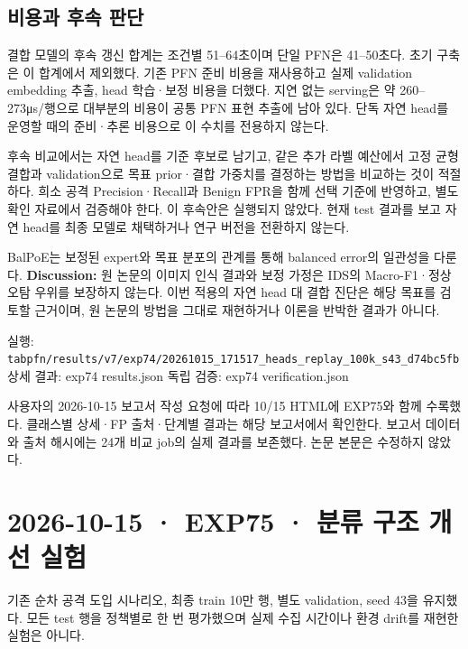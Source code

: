 \subsection{비용과 후속 판단}
결합 모델의 후속 갱신 합계는 조건별 51–64초이며 단일 PFN은 41–50초다. 초기 구축은 이 합계에서 제외했다. 기존 PFN 준비 비용을 재사용하고 실제 validation embedding 추출, head 학습·보정 비용을 더했다. 지연 없는 serving은 약 260–273μs/\allowbreak{}행으로 대부분의 비용이 공통 PFN 표현 추출에 남아 있다. 단독 자연 head를 운영할 때의 준비·추론 비용으로 이 수치를 전용하지 않는다.

후속 비교에서는 자연 head를 기준 후보로 남기고, 같은 추가 라벨 예산에서 고정 균형 결합과 validation으로 목표 prior·결합 가중치를 결정하는 방법을 비교하는 것이 적절하다. 희소 공격 Precision·Recall과 Benign FPR을 함께 선택 기준에 반영하고, 별도 확인 자료에서 검증해야 한다. 이 후속안은 실행되지 않았다. 현재 test 결과를 보고 자연 head를 최종 모델로 채택하거나 연구 버전을 전환하지 않는다.

BalPoE는 보정된 expert와 목표 분포의 관계를 통해 balanced error의 일관성을 다룬다. \textbf{Discussion:} 원 논문의 이미지 인식 결과와 보정 가정은 IDS의 Macro-F1·정상 오탐 우위를 보장하지 않는다. 이번 적용의 자연 head 대 결합 진단은 해당 목표를 검토할 근거이며, 원 논문의 방법을 그대로 재현하거나 이론을 반박한 결과가 아니다.

실행: \texttt{tabpfn/\allowbreak{}\allowbreak{}r\allowbreak{}esults/\allowbreak{}\allowbreak{}v\allowbreak{}7/\allowbreak{}\allowbreak{}exp74/\allowbreak{}\allowbreak{}20261015\allowbreak{}\_\allowbreak{}\allowbreak{}171517\_\allowbreak{}\allowbreak{}heads\_\allowbreak{}\allowbreak{}re\allowbreak{}play\_\allowbreak{}\allowbreak{}100\allowbreak{}k\_\allowbreak{}\allowbreak{}s43\_\allowbreak{}\allowbreak{}d7\allowbreak{}4bc5fb} 상세 결과: exp74 results.json 독립 검증: exp74 verification.json

사용자의 2026-10-15 보고서 작성 요청에 따라 10/\allowbreak{}15 HTML에 EXP75와 함께 수록했다. 클래스별 상세·FP 출처·단계별 결과는 해당 보고서에서 확인한다. 보고서 데이터와 출처 해시에는 24개 비교 job의 실제 결과를 보존했다. 논문 본문은 수정하지 않았다.



\section{2026-10-15 · EXP75 · 분류 구조 개선 실험}
\label{report:20261015_exp75_results}
기존 순차 공격 도입 시나리오, 최종 train 10만 행, 별도 validation, seed 43을 유지했다. 모든 test 행을 정책별로 한 번 평가했으며 실제 수집 시간이나 환경 drift를 재현한 실험은 아니다.

